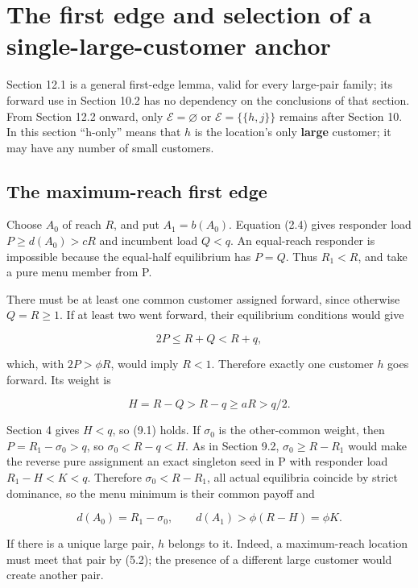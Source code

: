 \documentclass[11pt,a4paper]{article}
\begin{document}
\hypertarget{the-first-edge-and-selection-of-a-single-large-customer-anchor}{%
\section{The first edge and selection of a single-large-customer anchor}\label{the-first-edge-and-selection-of-a-single-large-customer-anchor}}

Section 12.1 is a general first-edge lemma, valid for every large-pair family; its forward use in Section 10.2 has no dependency on the conclusions of that section. From Section 12.2 onward, only \(\mathcal E=\varnothing\) or \(\mathcal E=\{\{h,j\}\}\) remains after Section 10. In this section ``h-only'' means that \(h\) is the location's only \textbf{large} customer; it may have any number of small customers.

\hypertarget{the-maximum-reach-first-edge}{%
\subsection{The maximum-reach first edge}\label{the-maximum-reach-first-edge}}

Choose \(A_0\) of reach \(R\), and put \(A_1=b(A_0)\). Equation (2.4) gives responder load \(P\ge d(A_0)>cR\) and incumbent load \(Q<q\). An equal-reach responder is impossible because the equal-half equilibrium has \(P=Q\). Thus \(R_1<R\), and take a pure menu member from P.

There must be at least one common customer assigned forward, since otherwise \(Q=R\ge1\). If at least two went forward, their equilibrium conditions would give

\[
2P\le R+Q<R+q,
\]

which, with \(2P>\phi R\), would imply \(R<1\). Therefore exactly one customer \(h\) goes forward. Its weight is

\[
H=R-Q>R-q\ge aR>q/2. \tag{12.1}
\]

Section 4 gives \(H<q\), so (9.1) holds. If \(\sigma_0\) is the other-common weight, then \(P=R_1-\sigma_0>q\), so \(\sigma_0<R-q<H\). As in Section 9.2, \(\sigma_0\ge R-R_1\) would make the reverse pure assignment an exact singleton seed in P with responder load \(R_1-H<K<q\). Therefore \(\sigma_0<R-R_1\), all actual equilibria coincide by strict dominance, so the menu minimum is their common payoff and

\[
d(A_0)=R_1-\sigma_0,\qquad d(A_1)>\phi(R-H)=\phi K. \tag{12.2}
\]

If there is a unique large pair, \(h\) belongs to it. Indeed, a maximum-reach location must meet that pair by (5.2); the presence of a different large customer would create another pair.
\end{document}
